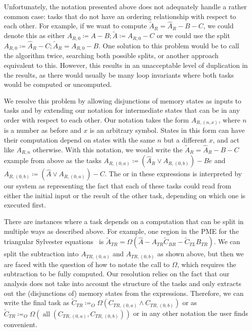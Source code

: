 \documentclass[12pt,letterpaper]{article}
\newcommand*{\mycite}[1]{~\cite{#1}}
\begin{document}
Unfortunately, the notation presented above does not adequately handle a rather common case: tasks that do not have an ordering relationship with respect to each other.
For example, if we want to compute $\widetilde{A}_R = \hat{A}_R - B - C$, we could denote this as either $A_{R, 0} \coloneqq \hat{A} - B; \widetilde{A} \coloneqq A_{R, 0} - C$ or we could use the split $A_{R, 0} \coloneqq \hat{A}_R - C; \widetilde{A}_R = A_{R, 0} - B$.
One solution to this problem would be to call the algorithm twice, searching both possible splits, or another approach equivalent to this.
However, this results in an unacceptable level of duplication in the results, as there would usually be many loop invariants where both tasks would be computed or uncomputed.

We resolve this problem by allowing disjunctions of memory states as inputs to tasks and by extending our notation for intermediate states that can be in any order with respect to each other.
Our notation takes the form $A_{R, (n, x)}$, where $n$ is a number as before and $x$ is an arbitrary symbol.
States in this form can have their computation depend on states with the same $n$ but a different $x$, and act like $A_{R, n}$ otherwise.
With this notation, we would write the $\widetilde{A}_R = \hat{A}_R - B - C$ example from above as the tasks $A_{R, (0, a)} \coloneqq (\hat{A}_R \vee A_{R, (0, b)}) - Be$ and $A_{R, (0, b)} \coloneqq (\hat{A} \vee A_{R, (0, a)}) - C$.
The or in these expressions is interpreted by our system as representing the fact that each of these tasks could read from either the initial input or the result of the other task, depending on which one is executed first.

There are instances where a task depends on a computation that can be split in multiple ways as described above.
For example, one region in the PME for the triangular Sylvester equations\mycite{Bientinesi2005} is $\widetilde{A}_{TR} = \Omega(\hat{A} - A_{TR}\widetilde{C}_{BR} - \widetilde{C}_{TL}B_{TR})$.
We can split the subtraction into $A_{TR, (0, a)}$ and $A_{TR, (0, b)}$ as shown above, but then we are faced with the question of how to notate the call to $\Omega$, which requires the subtraction to be fully computed.
Our resolution relies on the fact that our analysis does not take into account the structure of the tasks and only extracts out the (disjunctions of) memory states from the expressions.
Therefore, we can write the final task as $\widetilde{C}_{TR} \coloneqq_O \Omega(C_{TR, (0, a)} \wedge C_{TR, (0, b)})$ or as $\widetilde{C}_{TR} \coloneqq_O \Omega(\operatorname{all}(C_{TR, (0, a)}, C_{TR, (0, b)}))$ or in any other notation the user finds convenient.
\end{document}
